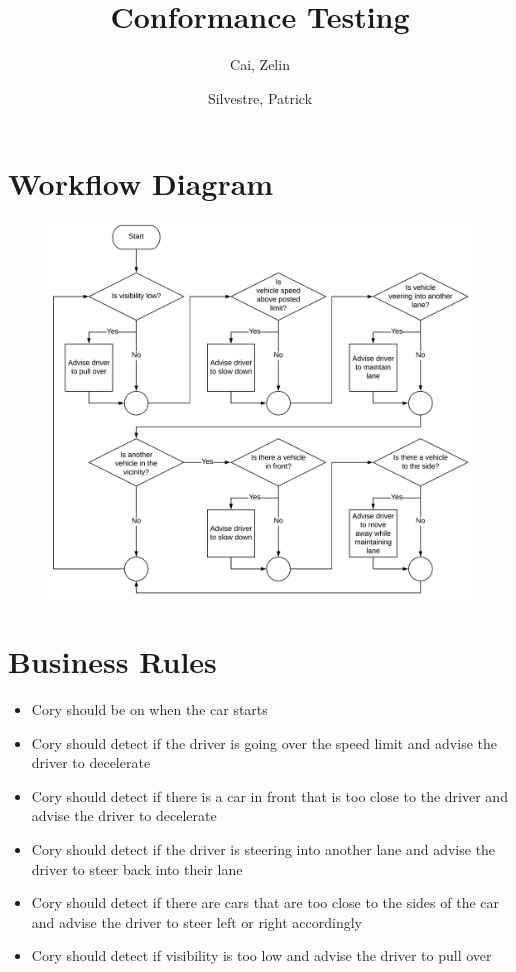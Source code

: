 \documentclass[10pt,letterpaper]{article}
\title{Conformance Testing}
\author{
	Cai, Zelin\\
	\and
	Silvestre, Patrick\\
}
\date{}
\begin{document}
\maketitle


\section{Workflow Diagram}
\begin{figure}[h]
	\centerline{\includegraphics[width=20cm]{workflow.png}}
\end{figure}

\section{Business Rules}
\begin{itemize}
	\item{Cory should be on when the car starts}
	\item{Cory should detect if the driver is going over the speed limit and advise the driver to decelerate}
	\item{Cory should detect if there is a car in front that is too close to the driver and advise the driver to decelerate}
	\item{Cory should detect if the driver is steering into another lane and advise the driver to steer back into their lane}
	\item{Cory should detect if there are cars that are too close to the sides of the car and advise the driver to steer left or right accordingly}
	\item{Cory should detect if visibility is too low and advise the driver to pull over}
\end{itemize}
\end{document}

